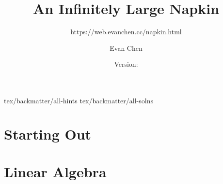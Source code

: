 \documentclass{book}
\title{An Infinitely Large Napkin}
\subtitle{\url{https://web.evanchen.cc/napkin.html}}
\author{Evan Chen}
\date{Version: \napkinversion}
\newcommand{\Opensolutionfile}{}
\newcommand{\parttoc}{}
\theoremstyle{definition}
\theoremstyle{definition}
\numberwithin{asy}{chapter}
\begin{document}
\frontmatter

\bgroup
\fboxrule=4pt
\noindent{}
\egroup
\newpage

\tableofcontents




\setcounter{chapter}{-1} %


\cleardoublepage
{}
\setcounter{temppage}{\value{page}}
\mainmatter
\setcounter{page}{\value{temppage}}

\tableofcontents

\Opensolutionfile{tex/backmatter/all-hints}
\Opensolutionfile{tex/backmatter/all-solns}

\part{Starting Out}
\label{part:startout}
\parttoc
\setcounter{chapter}{-1} %




% 
% 
% 

% 


\part{Linear Algebra}
\label{part:linalg}
\parttoc







\end{document}
